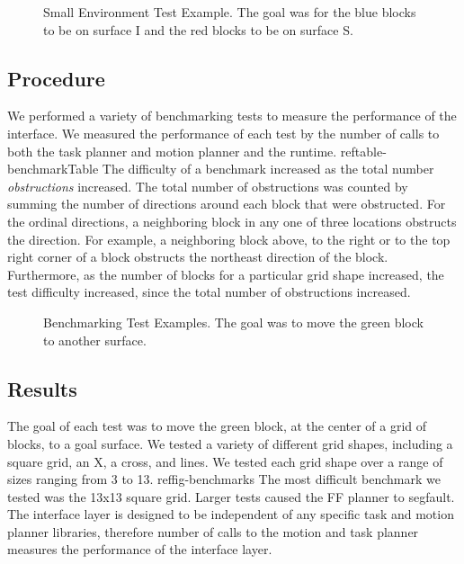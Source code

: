 \documentclass[12pt]{article}
\begin{document}
\begin{figure}[t]
\centering
\def\svgwidth{0.5\textwidth}

\caption{Small Environment Test Example. The goal was for the blue blocks to be on surface I and the red blocks to be on surface S.}
\end{figure}


\subsection{Procedure}

We performed a variety of benchmarking tests to measure the performance of the interface. We measured the performance of each test by the number of calls to both the task planner and motion planner and the runtime. ref{table-benchmarkTable}
The difficulty of a benchmark increased as the total number \textit{obstructions} increased. The total number of obstructions was counted by summing the number of directions around each block that were obstructed. For the ordinal directions, a neighboring block in any one of three locations obstructs the direction. For example, a neighboring block above, to the right or to the top right corner of a block obstructs the northeast direction of the block. Furthermore, as the number of blocks for a particular grid shape increased, the test difficulty increased, since the total number of obstructions increased.

\begin{figure}[t]
\centering
\def\svgwidth{\textwidth}

\caption{Benchmarking Test Examples. The goal was to move the green block to another surface.}
\end{figure}

\subsection{Results}
The goal of each test was to move the green block, at the center of a grid of blocks, to a goal surface. We tested a variety of different grid shapes, including a square grid, an X, a cross, and lines. We tested each grid shape over a range of sizes ranging from 3 to 13. ref{fig-benchmarks} The most difficult benchmark we tested was the 13x13 square grid. Larger tests caused the FF planner to segfault.
The interface layer is designed to be independent of any specific task and motion planner libraries, therefore number of calls to the motion and task planner measures the performance of the interface layer.
\end{document}
